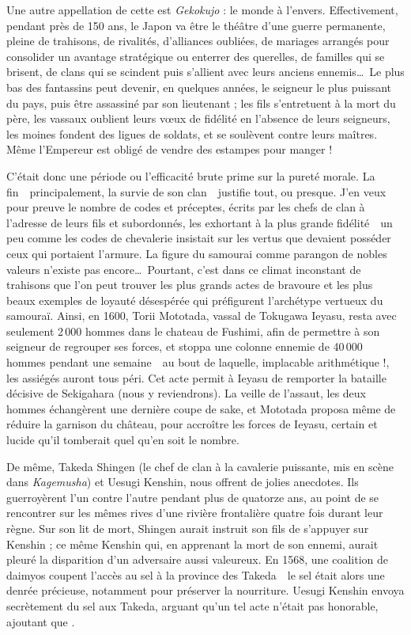 Une autre appellation de cette  est
\emph{Gekokujo} : le monde à l'envers.  Effectivement, pendant près de 150 ans,
le Japon va être le théâtre d'une guerre permanente, pleine de trahisons, de
rivalités, d'alliances oubliées, de mariages arrangés pour consolider un
avantage stratégique ou enterrer des querelles, de familles qui se brisent, de
clans qui se scindent puis s'allient avec leurs anciens ennemis\dots\ Le plus
bas des fantassins peut devenir, en quelques années, le seigneur le plus
puissant du pays, puis être assassiné par son lieutenant ; les fils
s'entretuent à la mort du père, les vassaux oublient leurs v\oe{}ux de fidélité
en l'absence de leurs seigneurs, les moines fondent des ligues de soldats, et
se soulèvent contre leurs maîtres. Même l'Empereur est obligé de vendre des
estampes pour manger !

C'était donc une période ou l'efficacité brute prime sur la pureté morale. La
fin~\incise~principalement, la survie de son clan~\incise~justifie tout, ou
presque. J'en veux pour preuve le nombre de codes et préceptes, écrits par les
chefs de clan à l'adresse de leurs fils et subordonnés, les exhortant à la plus
grande fidélité~\incise~un peu comme les codes de chevalerie insistait sur les
vertus que devaient posséder ceux qui portaient l'armure. La figure du samourai
comme parangon de nobles valeurs n'existe pas encore\dots\ Pourtant, c'est dans
ce climat inconstant de trahisons que l'on peut trouver les plus grands actes
de bravoure et les plus beaux exemples de loyauté désespérée qui préfigurent
l'archétype vertueux du samouraï. Ainsi, en 1600, Torii Mototada, vassal de
Tokugawa Ieyasu, resta avec seulement 2\,000 hommes dans le chateau de Fushimi,
afin de permettre à son seigneur de regrouper ses forces, et stoppa une colonne
ennemie de 40\,000 hommes pendant une semaine~\incise~au bout de laquelle,
implacable arithmétique !, les assiégés auront tous péri. Cet acte permit à
Ieyasu de remporter la bataille décisive de Sekigahara (nous y reviendrons). La
veille de l'assaut, les deux hommes échangèrent une dernière coupe de sake, et
Mototada proposa même de réduire la garnison du château, pour accroître les
forces de Ieyasu, certain et lucide qu'il tomberait quel qu'en soit le nombre.

De même, Takeda Shingen (le chef de clan à la cavalerie puissante, mis en scène
dans \emph{Kagemusha}) et Uesugi Kenshin, nous offrent de jolies anecdotes. Ils
guerroyèrent l'un contre l'autre pendant plus de quatorze ans, au point de se
rencontrer sur les mêmes rives d'une rivière frontalière quatre fois durant
leur règne. Sur son lit de mort, Shingen aurait instruit son fils de s'appuyer
sur Kenshin ; ce même Kenshin qui, en apprenant la mort de son ennemi, aurait
pleuré la disparition d'un adversaire aussi valeureux. En 1568, une coalition
de daimyos coupent l'accès au sel à la province des Takeda~\incise~le sel était
alors une denrée précieuse, notamment pour préserver la nourriture. Uesugi
Kenshin envoya secrètement du sel aux Takeda, arguant qu'un tel acte n'était
pas honorable, ajoutant que .

